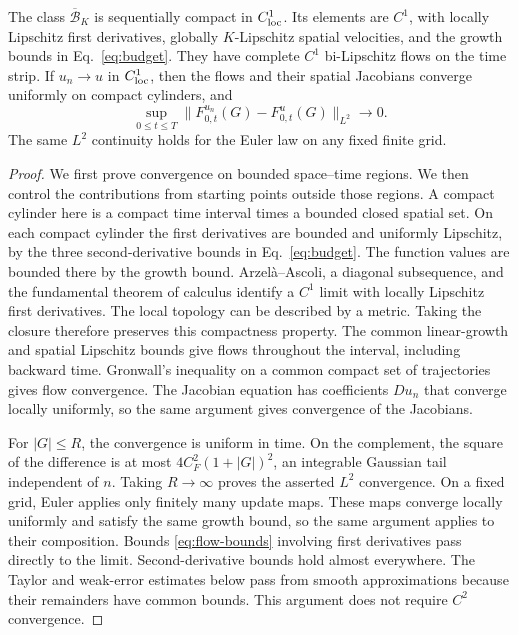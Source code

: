\begin{lemma}
\label{lem:compact}
The class $\overline{\mathcal B}_K$ is sequentially compact in $C^1_{\rm loc}$.
Its elements are $C^1$, with locally Lipschitz first derivatives, globally
$K$-Lipschitz spatial velocities, and the growth bounds in
Eq.~\eqref{eq:budget}. They have complete $C^1$ bi-Lipschitz flows on the time
strip. If $u_n\to u$ in $C^1_{\rm loc}$, then the flows and their spatial
Jacobians converge uniformly on compact cylinders, and
\[
 \sup_{0\le t\le T}\|F^{u_n}_{0,t}(G)-F^u_{0,t}(G)\|_{L^2}\longrightarrow0.
\]
The same $L^2$ continuity holds for the Euler law on any fixed finite grid.
\end{lemma}
\begin{proof}
We first prove convergence on bounded space--time regions. We then control
the contributions from starting points outside those regions. A compact cylinder here
is a compact time interval times a bounded closed spatial set.
On each compact cylinder the first derivatives are bounded and
uniformly Lipschitz, by the three second-derivative bounds in
Eq.~\eqref{eq:budget}. The function values are bounded there by the growth
bound. Arzel\`a--Ascoli, a diagonal subsequence, and the fundamental theorem of
calculus identify a $C^1$ limit with locally Lipschitz first derivatives.
The local topology can be described by a metric. Taking the closure therefore
preserves this compactness property. The common linear-growth and spatial
Lipschitz bounds give flows throughout the interval, including backward
time. Gronwall's inequality on a common compact set of trajectories gives
flow convergence. The Jacobian equation has coefficients $Du_n$ that converge
locally uniformly, so the same argument gives convergence of the Jacobians.

For $|G|\le R$, the convergence is uniform in time. On the complement,
the square of the difference is at most $4C_F^2(1+|G|)^2$, an integrable
Gaussian tail independent of $n$. Taking $R\to\infty$ proves the asserted
$L^2$ convergence. On a fixed grid, Euler applies only finitely many update
maps. These maps converge locally uniformly and satisfy the same growth
bound, so the same argument applies to their composition. Bounds
\eqref{eq:flow-bounds} involving first derivatives pass directly to the limit.
Second-derivative bounds hold almost everywhere. The Taylor and weak-error
estimates below pass from smooth approximations because their remainders
have common bounds. This argument does not require $C^2$ convergence.
\end{proof}

